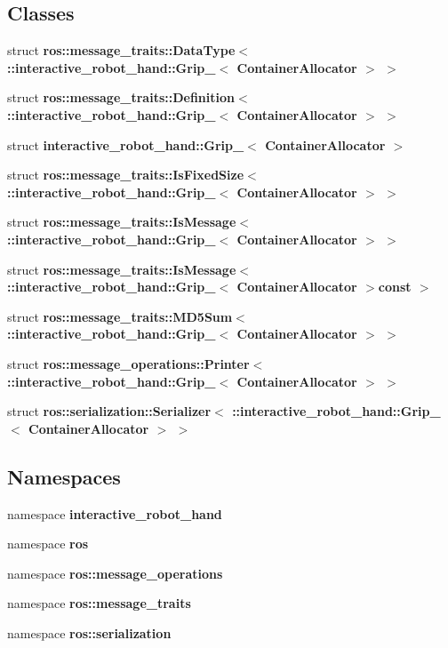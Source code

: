\subsection*{Classes}
\begin{DoxyCompactItemize}
\item 
struct {\bf ros\-::message\-\_\-traits\-::\-Data\-Type$<$ \-::interactive\-\_\-robot\-\_\-hand\-::\-Grip\-\_\-$<$ Container\-Allocator $>$ $>$}
\item 
struct {\bf ros\-::message\-\_\-traits\-::\-Definition$<$ \-::interactive\-\_\-robot\-\_\-hand\-::\-Grip\-\_\-$<$ Container\-Allocator $>$ $>$}
\item 
struct {\bf interactive\-\_\-robot\-\_\-hand\-::\-Grip\-\_\-$<$ Container\-Allocator $>$}
\item 
struct {\bf ros\-::message\-\_\-traits\-::\-Is\-Fixed\-Size$<$ \-::interactive\-\_\-robot\-\_\-hand\-::\-Grip\-\_\-$<$ Container\-Allocator $>$ $>$}
\item 
struct {\bf ros\-::message\-\_\-traits\-::\-Is\-Message$<$ \-::interactive\-\_\-robot\-\_\-hand\-::\-Grip\-\_\-$<$ Container\-Allocator $>$ $>$}
\item 
struct {\bf ros\-::message\-\_\-traits\-::\-Is\-Message$<$ \-::interactive\-\_\-robot\-\_\-hand\-::\-Grip\-\_\-$<$ Container\-Allocator $>$const  $>$}
\item 
struct {\bf ros\-::message\-\_\-traits\-::\-M\-D5\-Sum$<$ \-::interactive\-\_\-robot\-\_\-hand\-::\-Grip\-\_\-$<$ Container\-Allocator $>$ $>$}
\item 
struct {\bf ros\-::message\-\_\-operations\-::\-Printer$<$ \-::interactive\-\_\-robot\-\_\-hand\-::\-Grip\-\_\-$<$ Container\-Allocator $>$ $>$}
\item 
struct {\bf ros\-::serialization\-::\-Serializer$<$ \-::interactive\-\_\-robot\-\_\-hand\-::\-Grip\-\_\-$<$ Container\-Allocator $>$ $>$}
\end{DoxyCompactItemize}
\subsection*{Namespaces}
\begin{DoxyCompactItemize}
\item 
namespace {\bf interactive\-\_\-robot\-\_\-hand}
\item 
namespace {\bf ros}
\item 
namespace {\bf ros\-::message\-\_\-operations}
\item 
namespace {\bf ros\-::message\-\_\-traits}
\item 
namespace {\bf ros\-::serialization}
\end{DoxyCompactItemize}
